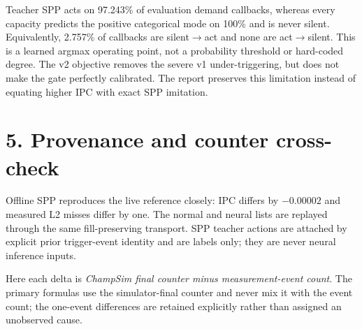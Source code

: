 \documentclass[10pt]{article}
\begin{document}
\begin{infobox}[title={\bfseries Remaining learned-gate limitation}]
Teacher SPP acts on 97.243\% of evaluation demand callbacks, whereas every
capacity predicts the positive categorical mode on 100\% and is never silent.
Equivalently, 2.757\% of callbacks are silent$\to$act and none are
act$\to$silent. This is a learned argmax operating point, not a probability
threshold or hard-coded degree.
The v2 objective removes the severe v1 under-triggering, but does not make the
gate perfectly calibrated. The report preserves this limitation instead of
equating higher IPC with exact SPP imitation.
\end{infobox}

\section*{5. Provenance and counter cross-check}
Offline SPP reproduces the live reference closely: IPC differs by
$-0.00002$ and measured L2 misses differ by one. The normal and neural lists
are replayed through the same fill-preserving transport. SPP teacher actions
are attached by explicit prior trigger-event identity and are labels only;
they are never neural inference inputs.

\begin{center}\scriptsize
{}
\end{center}

Here each delta is \emph{ChampSim final counter minus measurement-event
count}. The primary formulas use the simulator-final counter and never mix
it with the event count; the one-event differences are retained explicitly
rather than assigned an unobserved cause.
\end{document}
